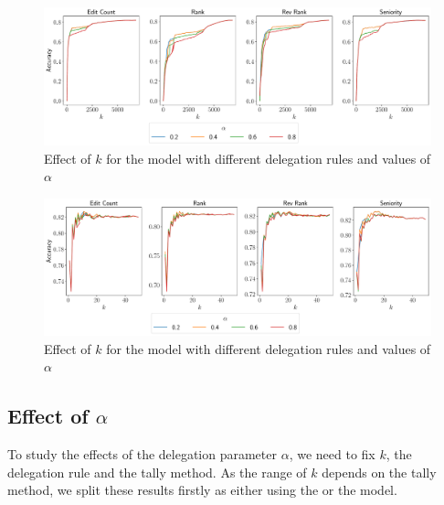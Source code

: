 \begin{figure}[t]
    \centering
    \includegraphics[width=\linewidth]{images/k_global.pdf}
    \caption{Effect of $k$ for the \globalv model with different delegation rules and values of $\alpha$}
    \label{fig:global-k}
\end{figure}
\begin{figure}[t]
    \centering
    \includegraphics[width=\linewidth]{images/k_local.pdf}
    \caption{Effect of $k$ for the \localv model with different delegation rules and values of $\alpha$}
    \label{fig:local-k}
\end{figure}
\subsection{Effect of $\alpha$}
To study the effects of the delegation parameter $\alpha$, we need to fix $k$, the delegation rule and the tally method. As the range of $k$ depends on the tally method, we split these results firstly as either using the \globalv or the \localv model.

